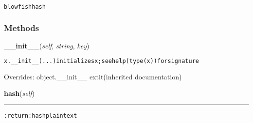 \begin{alltt}
blowfish hash 
\end{alltt}



  \subsubsection{Methods}

    \vspace{0.5ex}

\hspace{.8\funcindent}\begin{boxedminipage}{\funcwidth}

    \raggedright \textbf{\_\_init\_\_}(\textit{self}, \textit{string}, \textit{key})

\setlength{\parskip}{2ex}
\begin{alltt}
x.\_\_init\_\_(...) initializes x; see help(type(x)) for signature
\end{alltt}

\setlength{\parskip}{1ex}
      Overrides: object.\_\_init\_\_ 	extit{(inherited documentation)}

    \end{boxedminipage}

    \label{hal:maths:crypt:BLOWFISH:hash}

    \vspace{0.5ex}

\hspace{.8\funcindent}\begin{boxedminipage}{\funcwidth}

    \raggedright \textbf{hash}(\textit{self})

    \vspace{-1.5ex}

    \rule{\textwidth}{0.5\fboxrule}
\setlength{\parskip}{2ex}
\begin{alltt}

:return: hash plaintext
\end{alltt}

\setlength{\parskip}{1ex}
    \end{boxedminipage}


